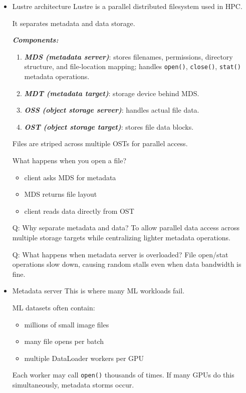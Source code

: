 \documentclass[12pt]{article}
\let\origtextbf\textbf
\renewcommand{\textbf}[1]{\origtextbf{\textit{#1}}}
\begin{document}
\begin{itemize}
\item Lustre architecture
Lustre is a parallel distributed filesystem used in HPC.

It separates metadata and data storage.

\textbf{Components:}
\begin{enumerate}[leftmargin=1.4em]
\item \textbf{MDS (metadata server)}: stores filenames, permissions, directory structure, and file-location mapping; handles \texttt{open()}, \texttt{close()}, \texttt{stat()} metadata operations.
\item \textbf{MDT (metadata target)}: storage device behind MDS.
\item \textbf{OSS (object storage server)}: handles actual file data.
\item \textbf{OST (object storage target)}: stores file data blocks.
\end{enumerate}

Files are striped across multiple OSTs for parallel access.

What happens when you open a file?
\begin{itemize}
\item client asks MDS for metadata
\item MDS returns file layout
\item client reads data directly from OST
\end{itemize}

Q: Why separate metadata and data?  
To allow parallel data access across multiple storage targets while centralizing lighter metadata operations.

Q: What happens when metadata server is overloaded?  
File open/stat operations slow down, causing random stalls even when data bandwidth is fine.

\item Metadata server
This is where many ML workloads fail.

ML datasets often contain:
\begin{itemize}
\item millions of small image files
\item many file opens per batch
\item multiple DataLoader workers per GPU
\end{itemize}

Each worker may call \texttt{open()} thousands of times. If many GPUs do this simultaneously, metadata storms occur.


\end{itemize}
\end{document}
